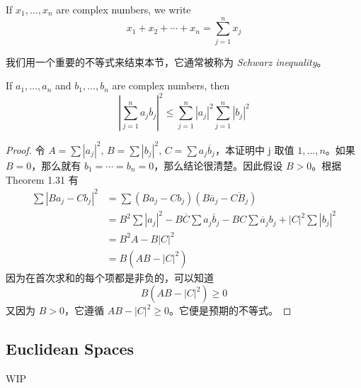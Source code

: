 \documentclass[../poma-note.tex]{subfiles}
\begin{document}
\begin{notation}
	If $x_1,\dots,x_n$ are complex numbers, we write
	\[x_1 + x_2 + \cdots + x_n = \sum_{j=1}^{n} x_j\]
\end{notation}

我们用一个重要的不等式来结束本节，它通常被称为 \textit{Schwarz inequality}。

\begin{theorem}
	If $a_1,\dots,a_n$ and $b_1,\dots,b_n$ are complex numbers, then
	\[\left|\sum_{j=1}^{n} a_j \overline{b}_j\right|^2 \le \sum_{j=1}^{n}|a_j|^2\sum_{j=1}^{n}|b_j|^2\]
\end{theorem}

\begin{proof}
	令 $A=\sum|a_j|^2, \, B=\sum|b_j|^2, \, C=\sum a_j\overline{b}_j$，本证明中 j 取值 $1,\dots,n$。如果 $B=0$，那么就有
	$b_1=\cdots=b_n=0$，那么结论很清楚。因此假设 $B>0$。根据 Theorem 1.31 有
	\begin{align*}
		\mathcal{} \sum|Ba_j - Cb_j|^2 & = \sum (Ba_j - Cb_j)(B\overline{a}_j - \overline{CB_j})                                              \\
		                               & = B^2\sum|a_j|^2 - B\overline{C}\sum a_j\overline{b}_j - BC\sum\overline{a}_j b_j + |C|^2\sum|b_j|^2 \\
		                               & = B^2A - B|C|^2                                                                                      \\
		                               & = B(AB - |C|^2)
	\end{align*}
	因为在首次求和的每个项都是非负的，可以知道
	\[B(AB-|C|^2)\ge0\]
	又因为 $B>0$，它遵循 $AB-|C|^2\ge0$。它便是预期的不等式。
\end{proof}

\subsection*{Euclidean Spaces}

WIP
\end{document}
